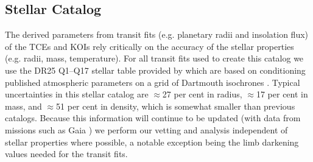\subsection{Stellar Catalog}
The derived parameters from transit fits (e.g. planetary radii and insolation flux) of the TCEs and KOIs rely critically on the accuracy of the stellar properties (e.g. radii, mass, temperature).   For all transit fits used to create this catalog we use the DR25 Q1--Q17 stellar table provided by \citet{Mathur2017} which are based on conditioning published atmospheric parameters on a grid of Dartmouth isochrones \citep{Dotter2008}.  Typical uncertainties in this stellar catalog are $\approx$27 per cent in radius, $\approx$17 per cent in mass, and $\approx$51 per cent in density, which is somewhat smaller than previous catalogs. Because this information will continue to be updated (with data from missions such as Gaia \citep{Gaia2016}) we perform our vetting and analysis independent of stellar properties where possible, a notable exception being the limb darkening values needed for the transit fits.